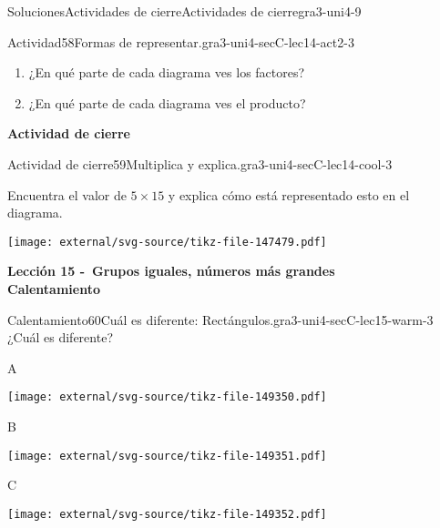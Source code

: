 \documentclass[twoside,10pt,]{article}
\begin{document}
\begin{solutions-section}{Soluciones}{Actividades de cierre}{}{Actividades de cierre}{}{}{gra3-uni4-9}
\begin{activitysolution}{Actividad}{58}{Formas de representar.}{gra3-uni4-secC-lec14-act2-3}
\begin{enumerate}
\item{}¿En qué parte de cada diagrama ves los factores?%
\item{}¿En qué parte de cada diagrama ves el producto?%
\end{enumerate}
\end{activitysolution}%
\par\medskip
\noindent\textbf{\large{}\space\textperiodcentered\space{}Actividad de cierre}
\begin{projectsolution}{Actividad de cierre}{59}{Multiplica y explica.}{gra3-uni4-secC-lec14-cool-3}%
\begin{sidebyside}{2}{0}{0}{0}%
\begin{sbspanel}{0.5}%
Encuentra el valor de \(5\times 15\) y explica cómo está representado esto en el diagrama.%
\end{sbspanel}%
\begin{sbspanel}{0.5}%
\texttt{[image: external/svg-source/tikz-file-147479.pdf]}
\end{sbspanel}%
\end{sidebyside}%
\end{projectsolution}%
\par\medskip
\noindent\textbf{\large{}\space\textperiodcentered\space{}Lección 15 -~Grupos iguales, números más grandes\\
\space\textperiodcentered\space{}Calentamiento}
\begin{explorationsolution}{Calentamiento}{60}{Cuál es diferente: Rectángulos.}{gra3-uni4-secC-lec15-warm-3}%
¿Cuál es diferente?%
\begin{sidebyside}{2}{0}{0}{0}%
\begin{sbspanel}{0.5}%
A%
\par
\texttt{[image: external/svg-source/tikz-file-149350.pdf]}
\end{sbspanel}%
\begin{sbspanel}{0.5}%
B%
\par
\texttt{[image: external/svg-source/tikz-file-149351.pdf]}
\end{sbspanel}%
\end{sidebyside}%
\begin{sidebyside}{2}{0}{0}{0}%
\begin{sbspanel}{0.5}%
C%
\par
\texttt{[image: external/svg-source/tikz-file-149352.pdf]}
\end{sbspanel}%
\begin{sbspanel}{0.5}%

\end{sbspanel}
\end{sidebyside}
\end{explorationsolution}
\end{solutions-section}
\end{document}
